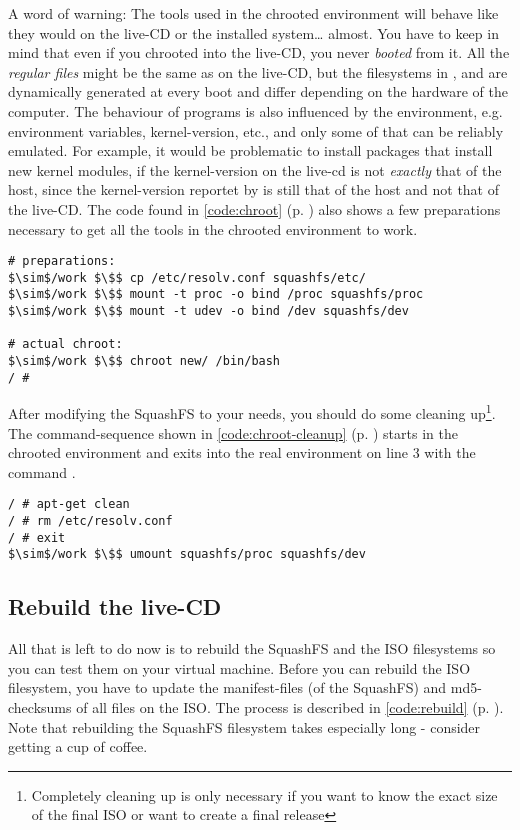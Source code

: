 A word of warning: The tools used in the chrooted environment will behave
like they would on the live-CD or the installed system\ldots{} almost. You have
to keep in mind that even if you chrooted into the live-CD, you never
\emph{booted} from it. All the \emph{regular files} might be the same as on the
live-CD, but the filesystems in ,  and  are
dynamically generated at every boot and differ depending on the hardware of the
computer. The behaviour of programs is also influenced by the environment, e.g.
environment variables, kernel-version, etc., and only some of that can be
reliably emulated. For example, it would be problematic to install packages that
install new kernel modules, if the kernel-version on the live-cd is not
\emph{exactly} that of the host, since the kernel-version reportet by
 is still that of the host and not that of the live-CD.
The code found in \lstlistingname{} \ref{code:chroot} (p. 
\pageref{code:chroot}) also shows a few preparations necessary to get all the
tools in the chrooted environment to work.\\

\begin{lstlisting}[caption={Chrooting into the SquashFS filesystem},float=ht, %
label=code:chroot]
# preparations:
$\sim$/work $\$$ cp /etc/resolv.conf squashfs/etc/
$\sim$/work $\$$ mount -t proc -o bind /proc squashfs/proc
$\sim$/work $\$$ mount -t udev -o bind /dev squashfs/dev

# actual chroot:
$\sim$/work $\$$ chroot new/ /bin/bash
/ # 
\end{lstlisting}

After modifying the SquashFS to your needs, you should do some
cleaning up\footnote{Completely cleaning up is only necessary if you want to know
the exact size of the final ISO or want to create a final release}. The
command-sequence shown in \lstlistingname{} \ref{code:chroot-cleanup} (p.
\pageref{code:chroot-cleanup}) starts in the chrooted environment and exits into
the real environment on line 3 with the command .
\begin{lstlisting}[caption={Cleanup the SquashFS},float=ht,%
	label={code:chroot-cleanup}]
/ # apt-get clean
/ # rm /etc/resolv.conf
/ # exit
$\sim$/work $\$$ umount squashfs/proc squashfs/dev
\end{lstlisting}

\subsection{Rebuild the live-CD}
All that is left to do now is to rebuild the SquashFS and the ISO filesystems so
you can test them on your virtual machine. Before you can rebuild the ISO
filesystem, you have to update the manifest-files (of the SquashFS) and
md5-checksums of all files on the ISO. The process is described in \lstlistingname{}
\ref{code:rebuild} (p. \pageref{code:rebuild}). Note that rebuilding the SquashFS
filesystem takes especially long - consider getting a cup of coffee.

